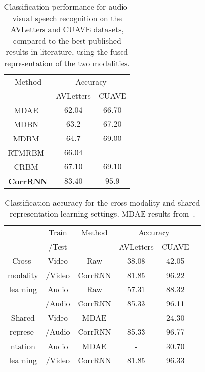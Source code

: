 \documentclass[10pt,twocolumn,letterpaper]{article}
\begin{document}
\begin{table}
\begin{center}
\begin{tabular}{|c||c|c|}
\hline
 Method & \multicolumn{2}{c|}{Accuracy} \\
 \cline{2-3}
       & AVLetters & CUAVE \\
\hline
\hline
MDAE~\cite{ngiam2011multimodal} & $62.04$ &  $66.70$ \\
\hline
MDBN~\cite{srivastava2012multimodal} &$63.2$ &$67.20$ \\
\hline
MDBM~\cite{srivastava2012multimodal} & $64.7$&$69.00$\\
\hline
RTMRBM~\cite{hu2016temporal} & $66.04$ & -\\
\hline
CRBM~\cite{amer2014multimodal} & $67.10$ & $69.10$ \\
\hline
\textbf{CorrRNN} & $\mathbf{83.40}$ & $\mathbf{95.9}$\\ 
\hline
\end{tabular}
\end{center}
\caption{Classification performance for audio-visual speech recognition on the AVLetters and CUAVE datasets, compared to the best published results in literature, using the fused representation of the two modalities.}
\label{tbl:audio-visual1}
\end{table}

\begin{table}
\begin{center}
\begin{tabular}{|c||c||c||c||c|c|}
\hline
 & Train & Method &\multicolumn{2}{c|}{Accuracy} \\
\cline{4-5}
       &   /Test    & & AVLetters & CUAVE \\
\hline
Cross- &Video & Raw& 38.08& 42.05\\
\cline{3-5}
modality&/Video & CorrRNN& 81.85& 96.22\\
\cline{2-5}
learning & Audio& Raw&57.31 & 88.32\\
\cline{3-5}
& /Audio&CorrRNN &85.33 & 96.11\\
\hline
\hline
Shared& Video& MDAE& -&24.30\\
\cline{3-5}
represe-& /Audio&CorrRNN &85.33 &96.77\\
\cline{2-5}
ntation & Audio& MDAE&- &30.70 \\
\cline{3-5}
learning& /Video&CorrRNN &81.85 & 96.33\\
\hline
\end{tabular}
\end{center}
\caption{Classification accuracy for the cross-modality and shared representation learning settings. MDAE results from~\cite{ngiam2011multimodal}.}
\label{tbl:audio-visual2}
\end{table}
\end{document}
